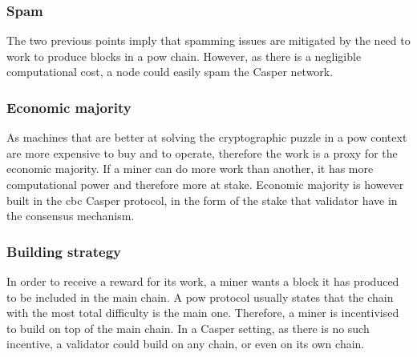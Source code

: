 \subsubsection{Spam}
The two previous points imply that spamming issues are mitigated by the need to
work to produce blocks in a \gls{pow} chain. However, as there is a negligible
computational cost, a node could easily spam the Casper network.

\subsubsection{Economic majority}
As machines that are better at solving the cryptographic puzzle in a \gls{pow}
context are more expensive to buy and to operate, therefore the work is a proxy
for the economic majority. If a miner can do more work than another, it has more
computational power and therefore more at stake.
Economic majority is however built in the \gls{cbc} Casper protocol, in the form
of the stake that validator have in the consensus mechanism.

\subsubsection{Building strategy}
In order to receive a reward for its work, a miner wants a block it has produced
to be included in the main chain. A \gls{pow} protocol usually states that the
chain with the most total difficulty is the main one. Therefore, a miner is
incentivised to build on top of the main chain.
In a Casper setting, as there is no such incentive, a validator could build on
any chain, or even on its own chain.


